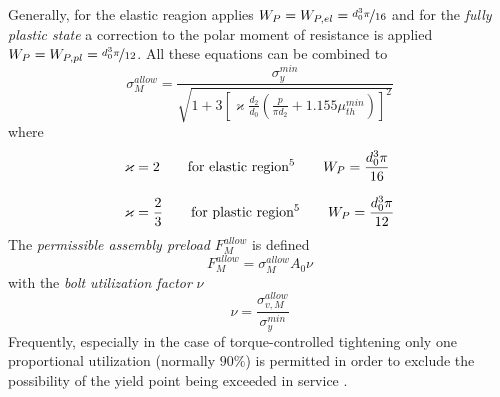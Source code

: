 Generally, for the elastic reagion applies $W_P=W_{P,el}=\nicefrac{d_0^3 \pi}{16}$ and for the
\emph{fully plastic state}\footnotemark[4] a correction to the 
polar moment of resistance is applied $W_P=W_{P,pl}=\nicefrac{d_0^3 \pi}{12}$. All these equations can 
be combined to 
\begin{equation}
    \sigma_M^{allow} = \frac{\sigma_y^{min}}{\sqrt{1+3\left[\varkappa \frac{d_2}{d_0}\left(
        \frac{p}{\pi d_2} + 1.155 \mu_{th}^{min} \right) \right]^2}}
    \label{equ:sig_M_allow}
\end{equation}
where 
\begin{subequations}
    \setlength{\jot}{10pt}
    \begin{align*}
        \varkappa&=2 \qquad \text{for elastic region\footnotemark[5]} \qquad W_P=\frac{d_0^3 \pi}{16} \\
        \varkappa&=\frac{2}{3} \qquad \text{for plastic region\footnotemark[5]} \qquad W_P=\frac{d_0^3 \pi}{12}
    \end{align*}
\end{subequations}
The \emph{permissible assembly preload} $F_M^{allow}$ is defined 
\begin{equation}
    F_M^{allow} = \sigma_M^{allow} A_0 \nu
\end{equation}
with the \emph{bolt utilization factor} $\nu$ 
\begin{equation*}
    \nu = \frac{\sigma_{v,M}^{allow}}{\sigma_y^{min}}
\end{equation*}
Frequently, especially in the case of torque-controlled tightening only one proportional utilization 
(normally $90\%$) is permitted in order to exclude the possibility of the yield point being exceeded in
service \cite{VDI2230_1}.
